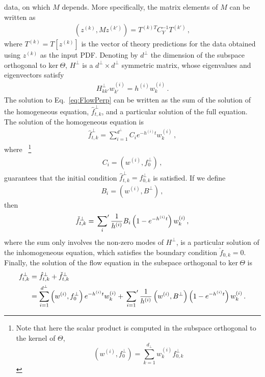 \documentclass[11pt]{article}
\begin{document}
data, on which $M$ depends. More specifically, the matrix elements of $M$ can be written as
\begin{align}
    \label{eq:MMatElems}
    \left(z^{(k)}, M z^{(k')}\right) = T^{(k)T} C_Y^{-1} T^{(k')}\, ,
\end{align} 
where $T^{(k)} = T[z^{(k)}]$ is the vector of theory predictions for the data obtained using $z^{(k)}$ as the 
input PDF. Denoting by $d^\perp$ the dimension of the subspace orthogonal to $\text{ker}\ \Theta$, $H^\perp$ is 
a $d^\perp\times d^\perp$ symmetric matrix, whose eigenvalues and eigenvectors satisfy
\begin{align}
    H^\perp_{kk'} w^{(i)}_{k'} = h^{(i)} w^{(i)}_{k}\, .
\end{align}
The solution to Eq.~\eqref{eq:FlowPerp} can be written as the sum of the solution of the 
homogeneous equation, $\hat{f}^{\perp}_{t,k}$, and a particular solution of the full equation. 
The solution of the homogeneous equation is
\begin{align}
    \label{eq:HomoSoln}
    \hat{f}^{\perp}_{t,k} = \sum_{i=1}^{d^\perp} C_i e^{-h^{(i)}t} w^{(i)}_k\, ,
\end{align}
where
~\footnote{
    Note that here the scalar product is computed in the subspace orthogonal to the kernel of $\Theta$,
    \[
        \left(w^{(i)}, f^\perp_0\right) = \sum_{k=1}^{d_\perp} w^{(i)}_{k} f^\perp_{0,k}
    \]
} 
\begin{align}
    \label{eq:InitialCi}
    C_i %
        = \left(w^{(i)}, f^\perp_0\right)\, , 
\end{align}
guarantees that the initial condition $\hat{f}^\perp_{t,k}=f^\perp_{0,k}$ is 
satisfied. If we define
\begin{align}
    \label{eq:BiDef}
    B_i %
            = \left(w^{(i)}, B^\perp\right)\, ,
\end{align}
then 
\begin{align}
    \label{eq:PartSol}
    \check{f}^\perp_{t,k} = \sideset{}{'}\sum_{i} \frac{1}{h^{(i)}} B_i 
        \left(1 - e^{-h^{(i)}t}\right) w^{(i)}_k\, ,
\end{align}
where the sum only involves the non-zero modes of $H^\perp$,
is a particular solution of the inhomogeneous equation, which satisfies the boundary 
condition $\check{f}_{0,k}=0$. Finally, the solution of the flow equation in the subspace orthogonal to 
$\text{ker}\ \Theta$ is 
\begin{align}
    f^\perp_{t,k} 
    \label{eq:FlowSolution}
        &= \hat{f}^\perp_{t,k} + \check{f}^\perp_{t,k} \\
        &= \sum_{i=1}^{d^\perp}  \left(w^{(i)}, f^\perp_0\right) e^{-h^{(i)}t} w^{(i)}_k
            + \sideset{}{'}\sum_{i=1}  \frac{1}{h^{(i)}} \left(w^{(i)}, B^\perp\right)
                \left(1 - e^{-h^{(i)}t}\right) w^{(i)}_k
        \, .
\end{align}
\end{document}
